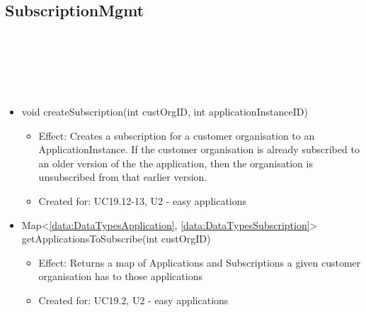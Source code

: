   \subsection{SubscriptionMgmt}\label{int:OnlineServiceOnlineServiceSubscriptionManagerSubscriptionMgmt}
    \begin{description}
      \item[Provided by:] \iconcomponent{}~
      \item[Required by:] \iconcomponent{}~
      \item[Operations:] ~
    \begin{itemize}[noitemsep,nolistsep,leftmargin=-.25cm]
      \item \textsf{void createSubscription(int custOrgID, int applicationInstanceID)}
        \begin{itemize}[noitemsep,nolistsep]
           \item Effect: Creates a subscription for a customer organisation to an ApplicationInstance. If the customer organisation is already subscribed to an older version of the the application, then the organisation is unsubscribed from that earlier version.
\item Created for: UC19.12-13, U2 - easy applications
        \end{itemize}
      \item \textsf{Map\textless{}\ref{data:DataTypesApplication}, \ref{data:DataTypesSubscription}\textgreater{} getApplicationsToSubscribe(int custOrgID)}
        \begin{itemize}[noitemsep,nolistsep]
           \item Effect: Returns a map of Applications and Subscriptions a given customer organisation has to those applications
\item Created for: UC19.2, U2 - easy applications
        \end{itemize}
    \end{itemize}
    \end{description}

